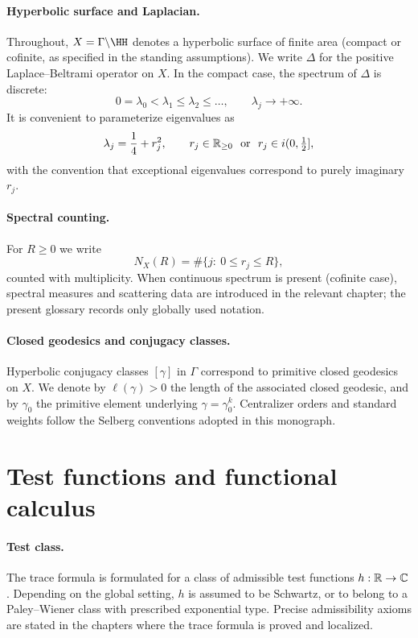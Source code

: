 \paragraph{Hyperbolic surface and Laplacian.}
Throughout, $X=\Gamma\backslash\HH$ denotes a hyperbolic surface of finite area (compact or cofinite, as specified in the standing assumptions).
We write $\Delta$ for the positive Laplace--Beltrami operator on $X$.
In the compact case, the spectrum of $\Delta$ is discrete:
\[
0=\lambda_0<\lambda_1\le\lambda_2\le\dots,\qquad \lambda_j\to+\infty.
\]
It is convenient to parameterize eigenvalues as
\[
\lambda_j=\frac14+r_j^2,\qquad
r_j\in \mathbb{R}_{\ge 0}\ \text{ or }\ r_j\in i(0,\tfrac12],
\]
with the convention that exceptional eigenvalues correspond to purely imaginary $r_j$.

\paragraph{Spectral counting.}
For $R\ge 0$ we write
\[
N_X(R)=\#\{j:\ 0\le r_j\le R\},
\]
counted with multiplicity. When continuous spectrum is present (cofinite case), spectral measures and scattering data are introduced in the relevant chapter; the present glossary records only globally used notation.

\paragraph{Closed geodesics and conjugacy classes.}
Hyperbolic conjugacy classes $[\gamma]$ in $\Gamma$ correspond to primitive closed geodesics on $X$.
We denote by $\ell(\gamma)>0$ the length of the associated closed geodesic, and by $\gamma_0$ the primitive element underlying $\gamma=\gamma_0^k$.
Centralizer orders and standard weights follow the Selberg conventions adopted in this monograph.

\section*{Test functions and functional calculus}

\paragraph{Test class.}
The trace formula is formulated for a class of admissible test functions $h:\mathbb{R}\to\mathbb{C}$.
Depending on the global setting, $h$ is assumed to be Schwartz, or to belong to a Paley--Wiener class with prescribed exponential type.
Precise admissibility axioms are stated in the chapters where the trace formula is proved and localized.

